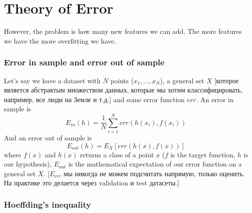 \section{Theory of Error}

However, the problem is how many new features we can add. The more features we have the more overfitting we have.

\hypertarget{ein_and_eout}{}
\subsubsection*{Error in sample and error out of sample}

Let's say we have a dataset with $N$ points ($x_1,\ldots,x_N$), a general set $X$ [которое является абстрактым множеством данных, которые мы хотим классифицировать, например, все люди на Земле и т.д.] and some error function $err$. An error in sample is
$$E_{in}(h)=\frac{1}{N}\sum\limits_{i=1}^N err(h(x_i),f(x_i))$$
And an error out of sample is
$$E_{out}(h)=E_X[err\left(h(x), f(x)\right)]$$
where $f(x)$ and $h(x)$ returns a class of a point $x$ ($f$ is the target function, $h$ is our hypothesis), $E_{out}$ is the mathematical expectation of our error function on a general set $X$. [$E_{err}$ мы никогда не можем подсчитать напрямую, только оценить. На практике это делается через validation и test датасеты.]\\

\subsubsection*{Hoeffding's inequality}

